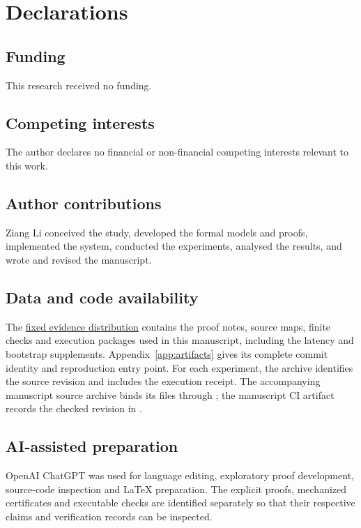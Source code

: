 \section*{Declarations}

\subsection*{Funding}
This research received no funding.

\subsection*{Competing interests}
The author declares no financial or non-financial competing interests
relevant to this work.

\subsection*{Author contributions}
Ziang Li conceived the study, developed the formal models and proofs,
implemented the system, conducted the experiments, analysed the results,
and wrote and revised the manuscript.

\subsection*{Data and code availability}
The \href{https://github.com/billlza/q-periapt/tree/947297e59be9d7fc8febb5d81a4e2b945e328208/paper/continuity}{fixed evidence distribution}
contains the proof notes, source maps, finite checks and execution
packages used in this manuscript, including the latency and bootstrap
supplements. Appendix~\ref{app:artifacts} gives its complete commit identity
and reproduction entry point. For each experiment, the archive identifies
the source revision and includes the execution receipt. The accompanying manuscript source
archive binds its files through ; the manuscript CI
artifact records the checked revision in .

\subsection*{AI-assisted preparation}
OpenAI ChatGPT was used for language editing, exploratory proof development,
source-code inspection and \LaTeX{} preparation. The explicit proofs,
mechanized certificates and executable checks are identified separately
so that their respective claims and verification records can be inspected.
